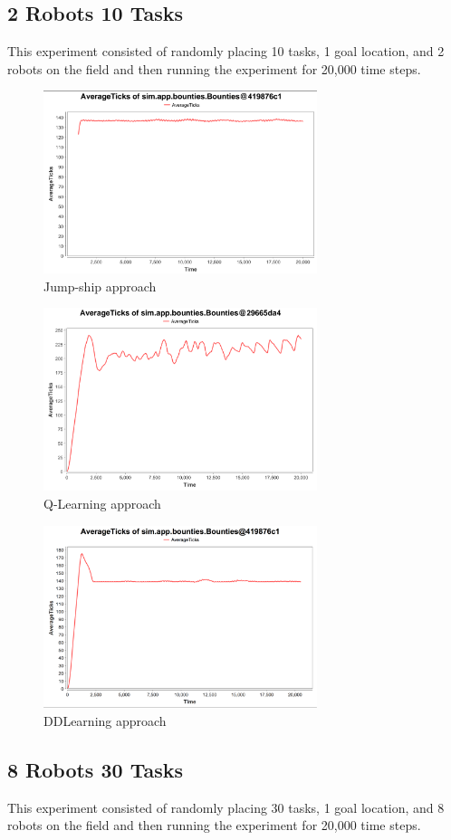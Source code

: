 \documentclass[twocolumn]{article}
\begin{document}
\subsection{2 Robots 10 Tasks}
This experiment consisted of randomly placing 10 tasks, 1 goal location, and 2 robots on the field and then running the experiment for 20,000 time steps.  
\begin{figure}[H]
\includegraphics[width=8cm]{greedy2and10}
\caption{Jump-ship approach}
\end{figure}
\begin{figure}[H]
\includegraphics[width=8cm]{qlearning2and10}
\caption{Q-Learning approach}
\end{figure}
\begin{figure}[H]
\includegraphics[width=8cm]{dd2and10}
\caption{DDLearning approach}
\end{figure}

\subsection{8 Robots 30 Tasks}
This experiment consisted of randomly placing 30 tasks, 1 goal location, and 8 robots on the field and then running the experiment for 20,000 time steps.
\end{document}
